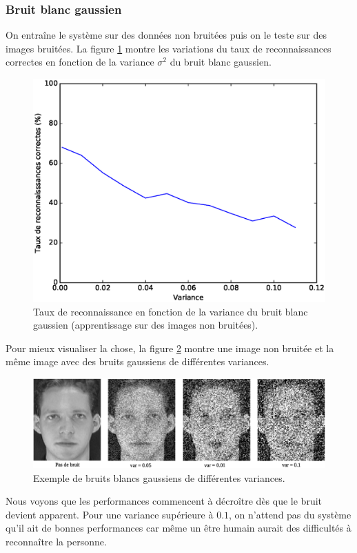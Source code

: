 \subsubsection{Bruit blanc gaussien}
On entraîne le système sur des données non bruitées puis on le teste sur des images
bruitées. La figure \ref{fig:robustness:gaussien:test} montre les variations du taux
de reconnaissances correctes en fonction de la variance $\sigma^2$ du bruit blanc
gaussien.
\begin{figure}[H]
    \centering
    \includegraphics[scale=0.5]{images/robustesse_gaussien_test}
    \caption{Taux de reconnaissance en fonction de la variance du bruit blanc gaussien
    (apprentissage sur des images non bruitées).}
    \label{fig:robustness:gaussien:test}
\end{figure}
Pour mieux visualiser la chose, la figure \ref{fig:robustness:gaussien:exemple} montre
une image non bruitée et la même image avec des bruits gaussiens de différentes variances.
\begin{figure}[H]
    \centering
    \includegraphics[scale=0.44]{images/robustness_gaussien_exemple}
    \caption{Exemple de bruits blancs gaussiens de différentes variances.}
    \label{fig:robustness:gaussien:exemple}
\end{figure}
Nous voyons que les performances commencent à décroître dès que le bruit
devient apparent. Pour une variance supérieure à $0.1$, on n'attend pas du système
qu'il ait de bonnes performances car même un être humain aurait des difficultés à
reconnaître la personne.

